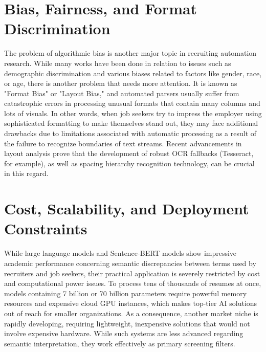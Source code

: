 \section{Bias, Fairness, and Format Discrimination}
The problem of algorithmic bias is another major topic in recruiting automation research. While many works have been done in relation to issues such as demographic discrimination and various biases related to factors like gender, race, or age, there is another problem that needs more attention. It is known as "Format Bias" or "Layout Bias," and automated parsers usually suffer from catastrophic errors in processing unusual formats that contain many columns and lots of visuals. In other words, when job seekers try to impress the employer using sophisticated formatting to make themselves stand out, they may face additional drawbacks due to limitations associated with automatic processing as a result of the failure to recognize boundaries of text streams. Recent advancements in layout analysis prove that the development of robust OCR fallbacks (Tesseract, for example), as well as spacing hierarchy recognition technology, can be crucial in this regard.


\section{Cost, Scalability, and Deployment Constraints}
While large language models and Sentence-BERT models show impressive academic performance concerning semantic discrepancies between terms used by recruiters and job seekers, their practical application is severely restricted by cost and computational power issues. To process tens of thousands of resumes at once, models containing 7 billion or 70 billion parameters require powerful memory resources and expensive cloud GPU instances, which makes top-tier AI solutions out of reach for smaller organizations. As a consequence, another market niche is rapidly developing, requiring lightweight, inexpensive solutions that would not involve expensive hardware. While such systems are less advanced regarding semantic interpretation, they work effectively as primary screening filters.

